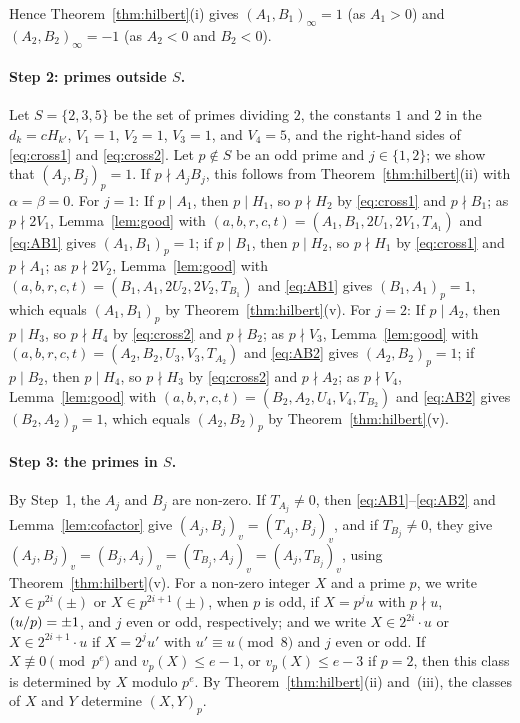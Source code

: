 \documentclass[11pt]{article}
\newcommand{\leg}[2]{\mathchoice{\biggl(\dfrac{#1}{#2}\biggr)}{(#1/#2)}{(#1/#2)}{(#1/#2)}}
\begin{document}
Hence Theorem~\ref{thm:hilbert}(i) gives $(A_{1},B_{1})_\infty=1$ (as $A_{1}>0$) and $(A_{2},B_{2})_\infty=-1$ (as $A_{2}<0$ and $B_{2}<0$).

\paragraph{Step 2: primes outside $S$.} Let $S=\{2,3,5\}$ be the set of primes dividing $2$, the constants $1$ and $2$ in the $d_k=cH_{k'}$, $V_{1}=1$, $V_{2}=1$, $V_{3}=1$, and $V_{4}=5$, and the right-hand sides of \eqref{eq:cross1} and \eqref{eq:cross2}. Let $p\notin S$ be an odd prime and $j\in\{1,2\}$; we show that $(A_j,B_j)_p=1$. If $p\nmid A_jB_j$, this follows from Theorem~\ref{thm:hilbert}(ii) with $\alpha=\beta=0$. For $j=1$: If $p\mid A_{1}$, then $p\mid H_{1}$, so $p\nmid H_{2}$ by \eqref{eq:cross1} and $p\nmid B_{1}$; as $p\nmid 2V_{1}$, Lemma~\ref{lem:good} with $(a,b,r,c,t)=(A_{1},B_{1},2U_{1},2V_{1},T_{A_{1}})$ and \eqref{eq:AB1} gives $(A_{1},B_{1})_p=1$; if $p\mid B_{1}$, then $p\mid H_{2}$, so $p\nmid H_{1}$ by \eqref{eq:cross1} and $p\nmid A_{1}$; as $p\nmid 2V_{2}$, Lemma~\ref{lem:good} with $(a,b,r,c,t)=(B_{1},A_{1},2U_{2},2V_{2},T_{B_{1}})$ and \eqref{eq:AB1} gives $(B_{1},A_{1})_p=1$, which equals $(A_{1},B_{1})_p$ by Theorem~\ref{thm:hilbert}(v). For $j=2$: If $p\mid A_{2}$, then $p\mid H_{3}$, so $p\nmid H_{4}$ by \eqref{eq:cross2} and $p\nmid B_{2}$; as $p\nmid V_{3}$, Lemma~\ref{lem:good} with $(a,b,r,c,t)=(A_{2},B_{2},U_{3},V_{3},T_{A_{2}})$ and \eqref{eq:AB2} gives $(A_{2},B_{2})_p=1$; if $p\mid B_{2}$, then $p\mid H_{4}$, so $p\nmid H_{3}$ by \eqref{eq:cross2} and $p\nmid A_{2}$; as $p\nmid V_{4}$, Lemma~\ref{lem:good} with $(a,b,r,c,t)=(B_{2},A_{2},U_{4},V_{4},T_{B_{2}})$ and \eqref{eq:AB2} gives $(B_{2},A_{2})_p=1$, which equals $(A_{2},B_{2})_p$ by Theorem~\ref{thm:hilbert}(v).

\paragraph{Step 3: the primes in $S$.} By Step~1, the $A_j$ and $B_j$ are non-zero. If $T_{A_j}\neq0$, then \eqref{eq:AB1}--\eqref{eq:AB2} and Lemma~\ref{lem:cofactor} give $(A_j,B_j)_v=(T_{A_j},B_j)_v$, and if $T_{B_j}\neq0$, they give $(A_j,B_j)_v=(B_j,A_j)_v=(T_{B_j},A_j)_v=(A_j,T_{B_j})_v$, using Theorem~\ref{thm:hilbert}(v). For a non-zero integer $X$ and a prime $p$, we write $X\in p^{2i}(\pm)$ or $X\in p^{2i+1}(\pm)$, when $p$ is odd, if $X=p^ju$ with $p\nmid u$, $\leg{u}{p}=\pm1$, and $j$ even or odd, respectively; and we write $X\in2^{2i}\cdot u$ or $X\in2^{2i+1}\cdot u$ if $X=2^ju'$ with $u'\equiv u\pmod 8$ and $j$ even or odd. If $X\not\equiv0\pmod{p^e}$ and $v_p(X)\leq e-1$, or $v_p(X)\leq e-3$ if $p=2$, then this class is determined by $X$ modulo $p^e$. By Theorem~\ref{thm:hilbert}(ii) and~(iii), the classes of $X$ and $Y$ determine $(X,Y)_p$.
\end{document}

